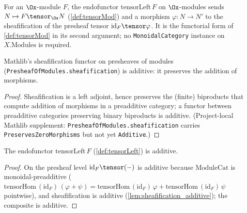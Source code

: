 \begin{definition}
  \label{def:tensorLeft}
  For an $\Ox$-module $F$, the endofunctor $\mathrm{tensorLeft}\,F$ on
  $\Ox$-modules sends $N \mapsto F \tensor_{\Ox} N$ (\cref{def:tensorMod}) and a
  morphism $\varphi : N \to N'$ to the sheafification of the presheaf tensor
  $\mathrm{id}_F \tensor \varphi$. It is the functorial form of \cref{def:tensorMod}
  in its second argument; no \texttt{MonoidalCategory} instance on
  $X.\mathrm{Modules}$ is required.
\end{definition}

\begin{lemma}

  \label{lem:sheafification_additive}
  Mathlib's sheafification functor on presheaves of modules
  (\texttt{PresheafOfModules.sheafification}) is additive: it preserves the
  addition of morphisms.
  \begin{proof}
    Sheafification is a left adjoint, hence preserves the (finite) biproducts that
    compute addition of morphisms in a preadditive category; a functor between
    preadditive categories preserving binary biproducts is additive. (Project-local
    Mathlib supplement: \texttt{PresheafOfModules.sheafification} carries
    \texttt{PreservesZeroMorphisms} but not yet \texttt{Additive}.)
  \end{proof}
\end{lemma}

\begin{lemma}

  \label{lem:tensorLeft_additive}
  The endofunctor $\mathrm{tensorLeft}\,F$ (\cref{def:tensorLeft}) is additive.
  \begin{proof}
    On the presheaf level $\mathrm{id}_F \tensor (-)$ is additive because
    $\mathrm{ModuleCat}$ is monoidal-preadditive
    ($\mathrm{tensorHom}\,(\mathrm{id}_F)\,(\varphi + \psi) =
    \mathrm{tensorHom}\,(\mathrm{id}_F)\,\varphi +
    \mathrm{tensorHom}\,(\mathrm{id}_F)\,\psi$ pointwise), and sheafification is
    additive (\cref{lem:sheafification_additive}); the composite is additive.
  \end{proof}
\end{lemma}

